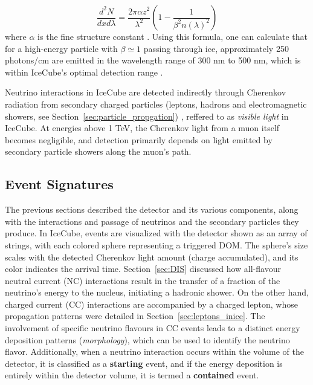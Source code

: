 \begin{equation}\label{eq:cherenkov_ph}
    \frac{d^2N}{dxd\lambda} = \frac{2\pi \alpha z^2}{\lambda^2} \left( 1 - \frac{1}{\beta^2 n(\lambda)^2} \right)
\end{equation}
where $\alpha$ is the fine structure constant . Using this formula, one can calculate that for a high-energy particle with $\beta \simeq 1$ passing through ice, approximately 250 photons/cm are emitted in the wavelength range of 300 nm to 500 nm, which is within IceCube's optimal detection range . 

Neutrino interactions in IceCube are detected indirectly through Cherenkov radiation from secondary charged particles (leptons, hadrons and electromagnetic showers, see Section~\ref{sec:particle_propgation}) , reffered to as \emph{visible light} in IceCube. At energies above 1 TeV, the Cherenkov light from a muon itself becomes negligible, and detection primarily depends on light emitted by secondary particle showers along the muon's path. 

\subsection{Event Signatures}
\label{sec:morphologies}
The previous sections described the detector and its various components, along with the interactions and passage of neutrinos and the secondary particles they produce. In IceCube, events are visualized with the detector shown as an array of strings, with each colored sphere representing a triggered DOM. The sphere's size scales with the detected Cherenkov light amount (charge accumulated), and its color indicates the arrival time. Section~\ref{sec:DIS} discussed how all-flavour neutral current (NC) interactions result in the transfer of a fraction of the neutrino's energy to the nucleus, initiating a hadronic shower. On the other hand, charged current (CC) interactions are accompanied by a charged lepton, whose propagation patterns were detailed in Section~\ref{sec:leptons_inice}. The involvement of specific neutrino flavours in CC events leads to a distinct energy deposition patterns (\emph{morphology}), which can be used to identify the neutrino flavor. Additionally, when a neutrino interaction occurs within the volume of the detector, it is classified as a \textbf{starting} event, and if the energy deposition is entirely within the detector volume, it is termed a \textbf{contained} event.

